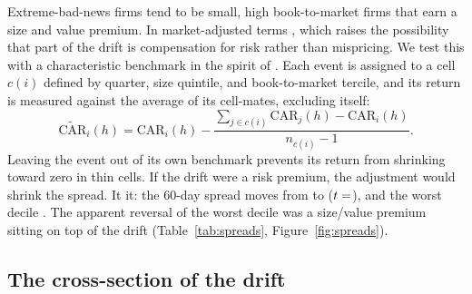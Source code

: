 \documentclass[11pt]{article}
\theoremstyle{definition}
\newcommand{\1}{\mathbf{1}}
\begin{document}
Extreme-bad-news firms tend to be small, high book-to-market firms that earn a size and value
premium. In market-adjusted terms , which raises the possibility that part of
the drift is compensation for risk rather than mispricing. We test this with a characteristic
benchmark in the spirit of \citet{DGTW1997}. Each event is assigned to a cell $c(i)$ defined by
quarter, size quintile, and book-to-market tercile, and its return is measured against the average of
its cell-mates, excluding itself:
\begin{equation}
  \widetilde{\mathrm{CAR}}_i(h)=\mathrm{CAR}_i(h)-\frac{\sum_{j\in c(i)}\mathrm{CAR}_j(h)-\mathrm{CAR}_i(h)}{n_{c(i)}-1}.
  \label{eq:loo}
\end{equation}
Leaving the event out of its own benchmark prevents its return from shrinking toward zero in thin
cells. If the drift were a risk premium, the adjustment would shrink the spread. It 
it: the 60-day spread moves from  to 
($t=\stv{spread.ff.t.h60}$), and the worst decile . The apparent reversal of the worst decile was a
size/value premium sitting on top of the drift (Table~\ref{tab:spreads}, Figure~\ref{fig:spreads}).

\begin{table}[t]\centering
\caption{Top-minus-bottom decile spread by horizon (\%), with quarter-clustered $t$-statistics.
Equity columns use the full sample with point-in-time deciles. Option columns also use point-in-time deciles and the option-matched subsample
( quarters;  at $+60$d) and measure the percentage return on premium of a
buy-and-hold near-the-money contract at its mid price.}\label{tab:spreads}

\end{table}

\subsection{The cross-section of the drift}
\end{document}
